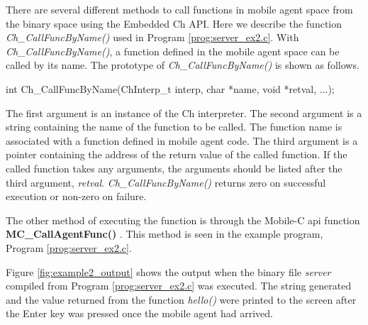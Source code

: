 \documentclass[11pt]{report}
\begin{document}
There are several different methods to call functions in mobile agent 
space from the binary space using the Embedded Ch API. 
Here we describe the function \textit{Ch\_CallFuncByName()}
 used in Program 
\ref{prog:server_ex2.c}.
With \textit{Ch\_CallFuncByName()}, a function defined in the mobile 
agent space can be called by its name. 
The prototype of \textit{Ch\_CallFuncByName()} is shown as follows.

int Ch\_CallFuncByName(ChInterp\_t interp, char *name, void *retval, ...);

The first argument is an instance of the Ch interpreter. 
The second argument is a string containing the name of the function to be 
called. 
The function name is associated with a function defined in mobile agent code. 
The third argument is a pointer containing the address of the return value of 
the called function. 
If the called function takes any arguments, the arguments should be listed 
after the third argument, \textit{retval}. 
\textit{Ch\_CallFuncByName()} returns zero on successful execution or 
non-zero on failure.

The other method of executing the function is through the Mobile-C
api function {\bf MC\_CallAgentFunc()} . 
This method is seen in the example program, Program \ref{prog:server_ex2.c}.

Figure \vref{fig:example2_output} shows the output when the binary file 
\textit{server} compiled from Program \ref{prog:server_ex2.c} was executed. 
The string generated and the value returned from the function \textit{hello()} 
were printed to the screen after the Enter key was pressed once the mobile 
agent had arrived. 



\end{document}
